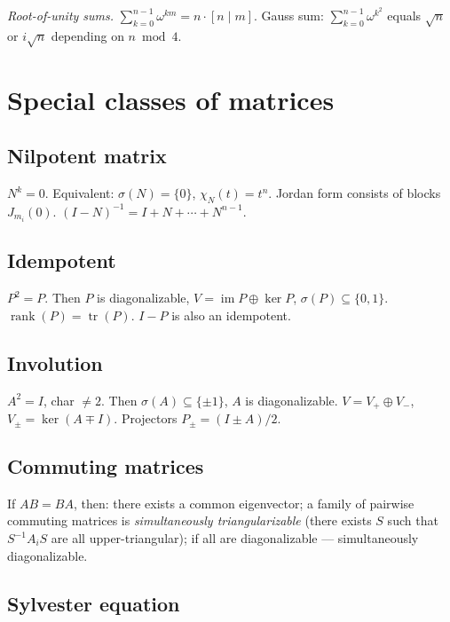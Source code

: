 \textit{Root-of-unity sums.} $\sum_{k=0}^{n-1}\omega^{km}=n\cdot[n\mid m]$. Gauss sum: $\sum_{k=0}^{n-1}\omega^{k^2}$ equals $\sqrt n$ or $i\sqrt n$ depending on $n\bmod4$.

\medskip

\section{Special classes of matrices}
\label{sec:special-matrices}

\subsection{Nilpotent matrix}
\label{subsec:nilpotent}

$N^k=0$. Equivalent: $\sigma(N)=\{0\}$, $\chi_N(t)=t^n$. Jordan form consists of blocks $J_{m_i}(0)$. $(I-N)^{-1}=I+N+\cdots+N^{n-1}$.

\subsection{Idempotent}
\label{subsec:idempotent}

$P^2=P$. Then $P$ is diagonalizable, $V=\operatorname{im}P\oplus\ker P$, $\sigma(P)\subseteq\{0,1\}$. $\operatorname{rank}(P)=\operatorname{tr}(P)$. $I-P$ is also an idempotent.

\subsection{Involution}
\label{subsec:involution}

$A^2=I$, char $\neq2$. Then $\sigma(A)\subseteq\{\pm1\}$, $A$ is diagonalizable. $V=V_+\oplus V_-$, $V_\pm=\ker(A\mp I)$. Projectors $P_\pm=(I\pm A)/2$.

\subsection{Commuting matrices}
\label{subsec:commuting}

If $AB=BA$, then: there exists a common eigenvector; a family of pairwise commuting matrices is \textit{simultaneously triangularizable} (there exists $S$ such that $S^{-1}A_iS$ are all upper-triangular); if all are diagonalizable --- simultaneously diagonalizable.

\subsection{Sylvester equation}
\label{subsec:sylvester-equation}

